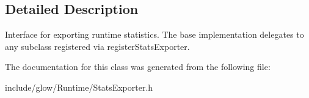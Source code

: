 \subsection{Detailed Description}
Interface for exporting runtime statistics. The base implementation delegates to any subclass registered via {\ttfamily register\+Stats\+Exporter}. 

The documentation for this class was generated from the following file\+:\begin{DoxyCompactItemize}
\item 
include/glow/\+Runtime/Stats\+Exporter.\+h\end{DoxyCompactItemize}
